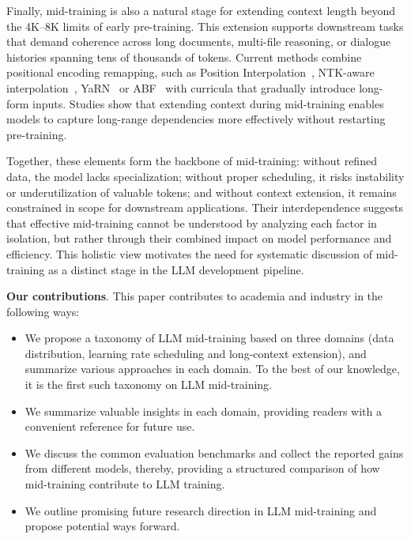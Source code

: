 Finally, mid-training is also a natural stage for extending context length beyond the 4K–8K limits of early pre-training. This extension supports downstream tasks that demand coherence across long documents, multi-file reasoning, or dialogue histories spanning tens of thousands of tokens. Current methods combine positional encoding remapping, such as Position Interpolation~\cite{chen2023extending}, NTK-aware interpolation~\cite{bloc97_ntk_rope_2023}, YaRN~\cite{peng2023yarn} or ABF~\cite{xiong2023effective} with curricula that gradually introduce long-form inputs. Studies show that extending context during mid-training enables models to capture long-range dependencies more effectively without restarting pre-training. 

Together, these elements form the backbone of mid-training: without refined data, the model lacks specialization; without proper scheduling, it risks instability or underutilization of valuable tokens; and without context extension, it remains constrained in scope for downstream applications. Their interdependence suggests that effective mid-training cannot be understood by analyzing each factor in isolation, but rather through their combined impact on model performance and efficiency. This holistic view motivates the need for systematic discussion of mid-training as a distinct stage in the LLM development pipeline.

\textbf{Our contributions}. This paper contributes to academia and industry in the following ways:
\begin{itemize}[leftmargin=10pt]
    \item We propose a taxonomy of LLM mid-training based on three domains (data distribution, learning rate scheduling and long-context extension), and summarize various approaches in each domain. To the best of our knowledge, it is the first such taxonomy on LLM mid-training.
    \item We summarize valuable insights in each domain, providing readers with a convenient reference for future use.
    \item We discuss the common evaluation benchmarks and collect the reported gains from different models, thereby, providing a structured comparison of how mid-training contribute to LLM training.
    \item We outline promising future research direction in LLM mid-training and propose potential ways forward.
\end{itemize}
